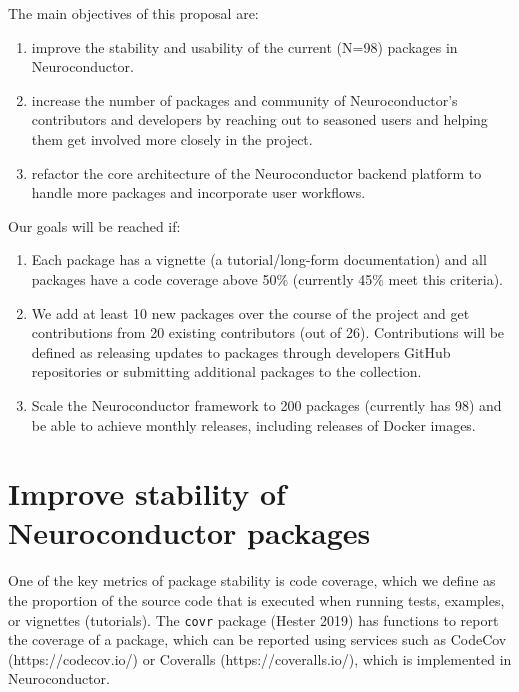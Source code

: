 \documentclass[]{elsarticle} %
\providecommand{\tightlist}{%
  \setlength{\itemsep}{0pt}\setlength{\parskip}{0pt}}
\begin{document}
The main objectives of this proposal are:

\begin{enumerate}
\def\labelenumi{\arabic{enumi}.}
\tightlist
\item
  improve the stability and usability of the current (N=98) packages in Neuroconductor.
\item
  increase the number of packages and community of Neuroconductor's contributors and developers by reaching out to seasoned users and helping them get involved more closely in the project.
\item
  refactor the core architecture of the Neuroconductor backend platform to handle more packages and incorporate user workflows.
\end{enumerate}

Our goals will be reached if:

\begin{enumerate}
\def\labelenumi{\arabic{enumi}.}
\tightlist
\item
  Each package has a vignette (a tutorial/long-form documentation) and all packages have a code coverage above 50\% (currently 45\% meet this criteria).
\item
  We add at least 10 new packages over the course of the project and get contributions from 20 existing contributors (out of 26). Contributions will be defined as releasing updates to packages through developers GitHub repositories or submitting additional packages to the collection.
\item
  Scale the Neuroconductor framework to 200 packages (currently has 98) and be able to achieve monthly releases, including releases of Docker images.
\end{enumerate}

\hypertarget{improve-stability-of-neuroconductor-packages}{%
\section{Improve stability of Neuroconductor packages}\label{improve-stability-of-neuroconductor-packages}}

One of the key metrics of package stability is code coverage, which we define as the proportion of the source code that is executed when running tests, examples, or vignettes (tutorials). The \texttt{covr} package (Hester 2019) has functions to report the coverage of a package, which can be reported using services such as CodeCov (https://codecov.io/) or Coveralls (https://coveralls.io/), which is implemented in Neuroconductor.
\end{document}
